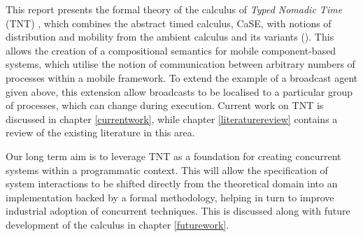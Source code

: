 This report presents the formal theory of the calculus of \emph{Typed
Nomadic Time} (TNT) \cite{hughes:nt}, which combines the abstract timed
calculus, CaSE, with notions of distribution and mobility from the
ambient calculus and its variants
(\cite{sangiorgi:mobsafeambients,controlledamb02}).  This allows the
creation of a compositional semantics for mobile component-based
systems, which utilise the notion of communication between arbitrary
numbers of processes within a mobile framework.  To extend the example
of a broadcast agent given above, this extension allow broadcasts to be
localised to a particular group of processes, which can change during
execution.  Current work on TNT is discussed in chapter
\ref{currentwork}, while chapter \ref{literaturereview} contains a
review of the existing literature in this area.  

Our long term aim is to leverage TNT as a foundation for creating
concurrent systems within a programmatic context. This will allow the
specification of system interactions to be shifted directly from the
theoretical domain into an implementation backed by a formal
methodology, helping in turn to improve industrial adoption of
concurrent techniques.  This is discussed along with future development
of the calculus in chapter \ref{futurework}.
